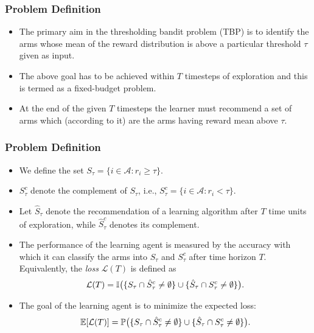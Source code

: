 \begin{frame}
\frametitle{Problem Definition}
\begin{itemize}
\item<1-> The primary aim in the thresholding bandit problem (TBP) is to identify the arms whose mean of the reward distribution is above a particular threshold $\tau$ given as input.
\item<2-> The above goal has to be achieved within $T$ timesteps of exploration and this is termed as a fixed-budget problem.
\item<3-> At the end of the given $T$ timesteps the learner must recommend a set of arms which (according to it) are the arms having reward mean above $\tau$.
\end{itemize}
\end{frame}

\begin{frame}
\frametitle{Problem Definition}
\begin{itemize}
\item<1-> We define the set $S_{\tau}=\lbrace i\in \mathcal{A}: r_{i}\geq \tau \rbrace$. 
\item<2-> $S_\tau^c$ denote the complement of $S_\tau$, i.e.,  $S_{\tau}^{c}=\lbrace i\in \mathcal{A}: r_{i} < \tau \rbrace$. 
\item<3-> Let $\hat{S}_{\tau}$ denote the recommendation of a learning algorithm after $T$ time units of exploration, while $\hat{S}_{\tau}^c$ denotes its complement.

\item<4-> The performance of the learning agent is measured by the accuracy with which it can classify the arms into $S_{\tau}$ and $S_{\tau}^{c}$ after time horizon $T$. Equivalently, the \emph{loss} $\mathcal{L}(T)$ is defined as
\begin{align*}
\mathcal{L} (T) = \mathbb{I}\big(\lbrace S_{\tau}\cap \hat{S}_{\tau}^{c}\neq \emptyset\rbrace    \cup    \lbrace\hat{S}_{\tau}\cap S_{\tau}^{c}\neq \emptyset\rbrace\big).
\end{align*}			

\item<4-> The goal of the learning agent is to minimize the expected loss:
\begin{align*}
\mathbb{E}[\mathcal{L}(T)] = \mathbb{P}\big(\lbrace S_{\tau}\cap \hat{S}_{\tau}^{c} \neq \emptyset \rbrace  \cup   \lbrace \hat{S}_{\tau}\cap S_{\tau}^{c} \neq \emptyset\rbrace\big).
\end{align*}
\end{itemize}
\end{frame}


